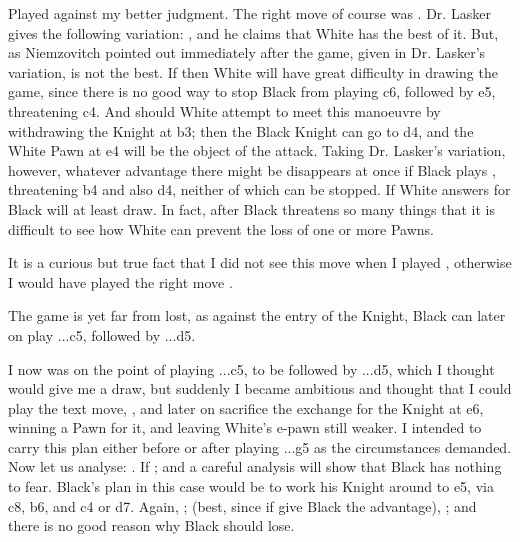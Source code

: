 \documentclass[10pt,twoside]{article}
\begin{document}
Played against my better judgment. The right move of course was . Dr. Lasker gives the following variation: , and he claims that White has the best of it. But, as Niemzovitch pointed out immediately after the game,  given in Dr. Lasker's variation, is not the best. If  then White will have great difficulty in drawing the game, since there is no good way to stop Black from playing \figN c6, followed by \figN e5, threatening \figN c4. And should White attempt to meet this manoeuvre by withdrawing the Knight at b3; then the Black Knight can go to d4, and the White Pawn at e4 will be the object of the attack. Taking Dr. Lasker's variation, however, whatever advantage there might be disappears at once if Black plays , threatening \figN b4 and also \figN d4, neither of which can be stopped. If White answers  for Black will at least draw. In fact, after  Black threatens so many things that it is difficult to see how White can prevent the loss of one or more Pawns.


It is a curious but true fact that I did not see this move when I played , otherwise I would have played the right move .


The game is yet far from lost, as against the entry of the Knight, Black can later on play ...c5, followed by ...d5.


\board

I now was on the point of playing ...c5, to be followed by ...d5, which I thought would give me a draw, but suddenly I became ambitious and thought that I could play the text move, , and later on sacrifice the exchange for the Knight at e6, winning a Pawn for it, and leaving White's e-pawn still weaker. I intended to carry this plan either before or after playing ...g5 as the circumstances demanded. Now let us analyse: . If ; and a careful analysis will show that Black has nothing to fear. Black's plan in this case would be to work his Knight around to e5, via c8, b6, and c4 or d7. Again, ;  (best, since if  give Black the advantage), ; and there is no good reason why Black should lose.
\end{document}
